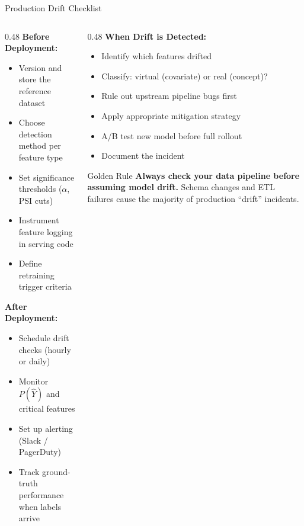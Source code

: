 \documentclass[10pt,aspectratio=169]{beamer}
\begin{document}
\begin{frame}{Production Drift Checklist}
  \begin{columns}[T]
    \begin{column}{0.48\textwidth}
      \textbf{Before Deployment:}
      \begin{itemize}
        \item[$\square$] Version and store the reference dataset
        \item[$\square$] Choose detection method per feature type
        \item[$\square$] Set significance thresholds ($\alpha$, PSI cuts)
        \item[$\square$] Instrument feature logging in serving code
        \item[$\square$] Define retraining trigger criteria
      \end{itemize}
      \vspace{0.2cm}
      \textbf{After Deployment:}
      \begin{itemize}
        \item[$\square$] Schedule drift checks (hourly or daily)
        \item[$\square$] Monitor $P(\hat{Y})$ and critical features
        \item[$\square$] Set up alerting (Slack / PagerDuty)
        \item[$\square$] Track ground-truth performance when labels arrive
      \end{itemize}
    \end{column}
    \begin{column}{0.48\textwidth}
      \textbf{When Drift is Detected:}
      \begin{itemize}
        \item[$\square$] Identify which features drifted
        \item[$\square$] Classify: virtual (covariate) or real (concept)?
        \item[$\square$] Rule out upstream pipeline bugs first
        \item[$\square$] Apply appropriate mitigation strategy
        \item[$\square$] A/B test new model before full rollout
        \item[$\square$] Document the incident
      \end{itemize}
      \vspace{0.2cm}
      \begin{alertblock}{Golden Rule}
        \textbf{Always check your data pipeline before assuming model drift.} Schema changes and ETL failures cause the majority of production ``drift'' incidents.
      \end{alertblock}
    \end{column}
  \end{columns}
\end{frame}
\end{document}
